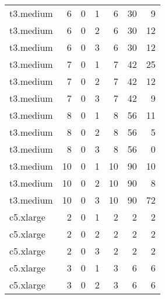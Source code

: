 \begin{tabular}{lrrrrrr}
    t3.medium &           6 &            0 &       1 &                 6 &                   30 &                 9 \\
    t3.medium &           6 &            0 &       2 &                 6 &                   30 &                12 \\
    t3.medium &           6 &            0 &       3 &                 6 &                   30 &                12 \\
    t3.medium &           7 &            0 &       1 &                 7 &                   42 &                25 \\
    t3.medium &           7 &            0 &       2 &                 7 &                   42 &                12 \\
    t3.medium &           7 &            0 &       3 &                 7 &                   42 &                 9 \\
    t3.medium &           8 &            0 &       1 &                 8 &                   56 &                11 \\
    t3.medium &           8 &            0 &       2 &                 8 &                   56 &                 5 \\
    t3.medium &           8 &            0 &       3 &                 8 &                   56 &                 0 \\
    t3.medium &          10 &            0 &       1 &                10 &                   90 &                10 \\
    t3.medium &          10 &            0 &       2 &                10 &                   90 &                 8 \\
    t3.medium &          10 &            0 &       3 &                10 &                   90 &                72 \\
    c5.xlarge &           2 &            0 &       1 &                 2 &                    2 &                 2 \\
    c5.xlarge &           2 &            0 &       2 &                 2 &                    2 &                 2 \\
    c5.xlarge &           2 &            0 &       3 &                 2 &                    2 &                 2 \\
    c5.xlarge &           3 &            0 &       1 &                 3 &                    6 &                 6 \\
    c5.xlarge &           3 &            0 &       2 &                 3 &                    6 &                 6 \\

\end{tabular}
